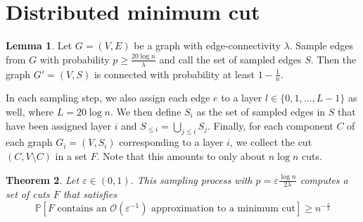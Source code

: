 \documentclass[a4paper, 12pt]{article}
\theoremstyle{plain}
\newtheorem{theorem}{Theorem}[section] %
\theoremstyle{definition}
\theoremstyle{lemma}
\newtheorem{lemma}[theorem]{Lemma}
\theoremstyle{remark}
\theoremstyle{corollary}
\theoremstyle{example}
\begin{document}
\section{Distributed minimum cut}
	\begin{lemma}
		Let $G = (V,E)$ be a graph with edge-connectivity $\lambda$. Sample edges from $G$ with probability $p \geq \frac{20 \log n}{\lambda}$ and call the set of sampled edges $S$. Then the graph $G' = (V,S)$ is connected with probability at least $1-\frac{1}{n}$. 
	\end{lemma}
	In each sampling step, we also assign each edge $e$ to a layer $l \in \{0,1,...,L-1\}$ as well, where $L = 20 \log n$. We then define $S_i$ as the set of sampled edges in $S$ that have been assigned layer $i$ and $S_{\leq i} = \bigcup_{j \leq i} S_j$. Finally, for each component $C$ of each graph $G_i = (V,S_i)$ corresponding to a layer $i$, we collect the cut $(C, V\setminus C)$ in a set $F$. Note that this amounts to only about $n \log n$ cuts.
	\begin{theorem}
		Let $\varepsilon \in (0,1)$. This sampling process with $p = \varepsilon \frac{\log n}{2 \lambda}$ computes a set of cuts $F$ that satisfies \[\mathbb{P}[F \text{ contains an } \mathcal{O}(\varepsilon^{-1}) \text{ approximation to a minimum cut}] \geq n^{-\frac{\varepsilon}{2}}\]
	\end{theorem}
\end{document}
